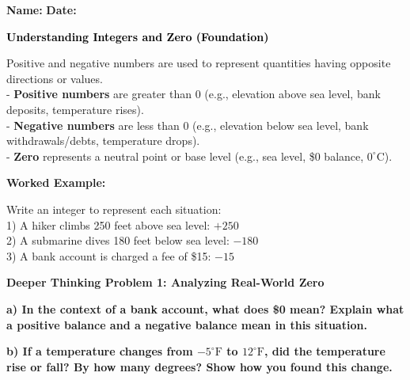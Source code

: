 \documentclass[12pt, letterpaper, fleqn]{article}
\begin{document}
\textbf{Name:} \underline{\hspace{5cm}}
\hfill
\textbf{Date:} \underline{\hspace{3cm}}\\

\begin{tcolorbox}[colback=black!10]
    \large\textcolor{black}{\textbf{Understanding Integers and Zero (Foundation)}}
\end{tcolorbox}

\vspace{3mm}

\noindent
Positive and negative numbers are used to represent quantities having opposite directions or values. \\
- \textbf{Positive numbers} are greater than 0 (e.g., elevation above sea level, bank deposits, temperature rises). \\
- \textbf{Negative numbers} are less than 0 (e.g., elevation below sea level, bank withdrawals/debts, temperature drops). \\
- \textbf{Zero} represents a neutral point or base level (e.g., sea level, \$0 balance, $0^\circ\text{C}$).

\vspace{4mm}

\begin{tcolorbox}[colback=white, colframe=black!25, boxrule=0.6pt, arc=4mm, left=6mm, right=6mm, top=5mm, bottom=5mm]
\textbf{Worked Example:}

\medskip
\noindent
Write an integer to represent each situation:\\
1) A hiker climbs 250 feet above sea level: $+250$\\
2) A submarine dives 180 feet below sea level: $-180$\\
3) A bank account is charged a fee of \$15: $-15$
\end{tcolorbox}

\vspace{4mm}

\begin{tcolorbox}[colback=black!5, colframe=black!50, boxrule=1pt, arc=4mm, left=6mm, right=6mm, top=5mm, bottom=5mm]
\textbf{Deeper Thinking Problem 1: Analyzing Real-World Zero}

\medskip

\noindent
\textbf{a) In the context of a bank account, what does \$0 mean? Explain what a positive balance and a negative balance mean in this situation.}

\vspace{2cm}

\noindent
\textbf{b) If a temperature changes from $-5^\circ\text{F}$ to $12^\circ\text{F}$, did the temperature rise or fall? By how many degrees? Show how you found this change.}

\vspace{2cm}
\end{tcolorbox}
\newpage
\end{document}
